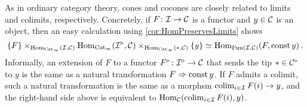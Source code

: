 \begin{con}
	As in ordinary category theory, cones and cocones are closely related to limits and colimits, respectively. Concretely, if $F\colon \mathcal{I}\rightarrow \mathcal{C}$ is a functor and $y\in\mathcal{C}$ is an object, then an easy calculation using \cref{cor:HomPreservesLimits} shows
	\begin{equation*}
		\{F\}\times_{\operatorname{Hom}_{\mathrm{Cat}_\infty}(\mathcal{I},\mathcal{C})}\operatorname{Hom}_{\mathrm{Cat}_\infty}(\mathcal{I}^\triangleright,\mathcal{C})\times_{\operatorname{Hom}_{\mathrm{Cat}_\infty}(*,\mathcal{C})}\{y\}\simeq \operatorname{Hom}_{\operatorname{Fun}(\mathcal{I},\mathcal{C})}(F,\operatorname{const} y)\,.
	\end{equation*}
	Informally, an extension of $F$ to a functor $F^\triangleright \colon \mathcal{I}^\triangleright\rightarrow \mathcal{C}$ that sends the tip $*\in \mathcal{C}^\triangleright$ to $y$ is the same as a natural transformation $F\Rightarrow \operatorname{const} y$. If $F$ admits a colimit, such a natural transformation is the same as a morphsm $\operatorname*{colim}_{i\in\mathcal{I}}F(i)\rightarrow y$, and the right-hand side above is equivalent to $\operatorname{Hom}_{\mathcal{C}}(\operatorname*{colim}_{i\in\mathcal{I}}F(i),y)$.
\end{con}

